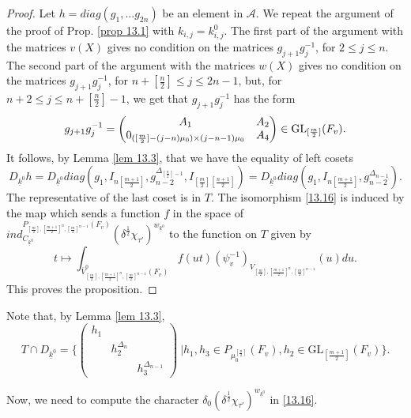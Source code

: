 \documentclass[12pts]{amsart}
\newcommand{\GL}{{\mathrm{GL}}}
\begin{document}
\begin{proof}
Let $h=diag(g_1,...g_{2n})$ be an element in $\mathcal{A}$. We repeat the argument of the proof of Prop. \ref{prop 13.1} with $k_{i,j}=k^0_{i,j}$. The first part of the argument with the matrices $v(X)$ gives no condition on the matrices $g_{j+1}g_j^{-1}$, for $2\leq j \leq n$. The second part of the argument with the matrices $w(X)$ gives no condition on the matrices $g_{j+1}g_j^{-1}$, for $n+[\frac{n}{2}]\leq j\leq 2n-1$, but, for $n+2\leq j\leq n+[\frac{n}{2}]-1$, we get that $g_{j+1}g_j^{-1}$ has the form
$$	
g_{j+1}g_j^{-1}=\begin{pmatrix}A_1&A_2\\0_{\scriptsize{([\frac{m}{2}]-(j-n)\mu_0)\times (j-n-1)\mu_0}}&A_4\end{pmatrix}\in \GL_{[\frac{m}{2}]}(F_v).
$$	
It follows, by Lemma \ref{lem 13.3}, that we have the equality of left cosets 
$$
D_{\underline{k}^0}h=D_{\underline{k}^0}diag(g_1, I_{n[\frac{m+1}{2}]},g_{n-2}^{\Delta_{[\frac{n}{2}]-1}},I_{[\frac{m}{2}][\frac{n+1}{2}]})=D_{\underline{k}^0}diag(g_1, I_{n[\frac{m+1}{2}]},g_{n-2}^{\Delta_{n-1}}).
$$	
The representative of the last coset is in $T$. The isomorphism \eqref{13.16} is induced by the map which sends a function $f$ in the space of $ind^{P_{[\frac{m}{2}],[\frac{m+1}{2}]^n,[\frac{m}{2}]^{n-1}}(F_v)}_{C_{\underline{k}^0}}(\delta^{\frac{1}{2}}\chi_{\tau'})^{w_{\underline{k}^0}}$ to the function on $T$ given by
$$t\mapsto \int_{\bar{V}_{[\frac{m}{2}],[\frac{m+1}{2}]^n,[\frac{m}{2}]^{n-1}}^0(F_v)}f(ut)(\psi^{-1}_v)_{V_{[\frac{m}{2}],[\frac{m+1}{2}]^n,[\frac{m}{2}]^{n-1}}}(u)du.
$$
This proves the proposition.		
	
\end{proof}

Note that, by Lemma \ref{lem 13.3},
\begin{equation}\label{13.17}
T\cap D_{\underline{k}^0}=\{ \begin{pmatrix}h_1\\&h_2^{\Delta_n}\\&&h_3^{\Delta_{n-1}}\end{pmatrix}\ |h_1,h_3\in P_{\mu_0^{[\frac{n}{2}]}}(F_v), h_2\in \GL_{[\frac{m+1}{2}]}(F_v)\}.
\end{equation}

Now, we need to compute the character $\delta_0(\delta^{\frac{1}{2}}\chi_{\tau'})^{w_{\underline{k}^0}}$ in \eqref{13.16}. 
\end{document}
